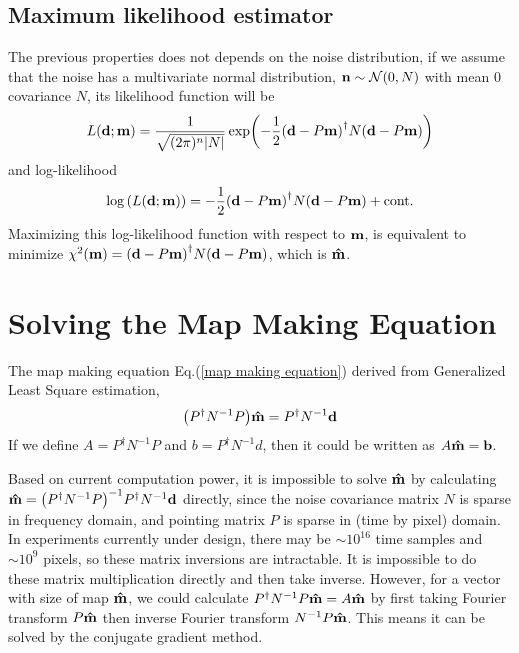 \documentclass[11pt, letterpaper]{article}
\newcommand{\vbd}{\vb{d}}
\newcommand{\vbm}{\vb{m}}
\newcommand{\vbn}{\vb{n}}
\newcommand{\vbb}{\vb{b}}
\newcommand{\inv}[1]{#1^{-1}}
\newcommand{\hatm}{\vb{\hat{m}}}
\newcommand{\Pdagger}{P^{\dagger}}
\newcommand{\PPinv}[1]{\inv{\qty(\Pdagger #1 P)}}
\begin{document}
\subsection{Maximum likelihood estimator}
The previous properties does not depends on the noise distribution, 
if we assume that the noise has a multivariate normal distribution,
$\vbn \sim \mathcal{N}(0, N)$ with mean $0$ covariance $N$,
its likelihood function will be
\begin{align}
L\qty(\vbd;\vbm) = \frac{1}{\sqrt{(2\pi)^n \abs{N}}} 
    \exp(-\frac{1}{2} \qty(\vbd - P\vbm)^{\dagger} N \qty(\vbd - P\vbm))
\end{align}
and log-likelihood
\begin{align}
\log\qty(L\qty(\vbd;\vbm))
= -\frac{1}{2} \qty(\vbd - P\vbm)^{\dagger} N \qty(\vbd - P\vbm) + \text{cont.}  
\end{align}
Maximizing this log-likelihood function with respect to $\vbm$, is equivalent
to minimize $\chi^2(\vbm) =\qty(\vbd - P\vbm)^{\dagger} N \qty(\vbd - P\vbm)$,
which is $\hatm$.

\section{Solving the Map Making Equation}

The map making equation Eq.(\ref{map making equation}) derived from Generalized
Least Square estimation,
\begin{align}
\qty(\Pdagger \inv{N}  P) \hatm = \Pdagger \inv{N} \vbd \label{map making eq}
\end{align}
If we define $A = \Pdagger \inv{N} P$ and $b = \Pdagger \inv{N} d$,
then it could be written as $A\hatm = \vbb$.

Based on current computation power, it is impossible to solve $\hatm$
by calculating $\hatm = \PPinv{\inv{N}} \Pdagger \inv{N} \vbd$ directly,
since the noise covariance matrix $N$ is sparse in frequency domain,
and pointing matrix $P$ is sparse in (time by pixel) domain.  In experiments currently under design, there may be $\sim 10^{16}$ time samples and $\sim 10^{9}$ pixels, so these matrix inversions are intractable.
It is impossible to do these matrix multiplication directly and then take
inverse.
However, for a vector with size of map $\hatm$, we could calculate
$\Pdagger \inv{N} P \hatm = A\hatm$ by first taking Fourier transform $P\hatm$
then inverse Fourier transform $\inv{N}P\hatm$.
This means it can be solved by the conjugate gradient method.
\end{document}
